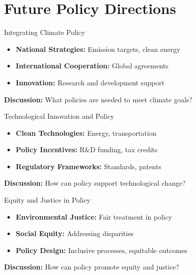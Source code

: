 \documentclass[11pt, aspectratio=169]{beamer}
\begin{document}
\section{Future Policy Directions}

\begin{frame}{Integrating Climate Policy}
    \begin{itemize}
        \item \textbf{National Strategies:} Emission targets, clean energy
        \item \textbf{International Cooperation:} Global agreements
        \item \textbf{Innovation:} Research and development support
    \end{itemize}
    \pause
    \textbf{Discussion:} What policies are needed to meet climate goals?
\end{frame}

\begin{frame}{Technological Innovation and Policy}
    \begin{itemize}
        \item \textbf{Clean Technologies:} Energy, transportation
        \item \textbf{Policy Incentives:} R\&D funding, tax credits
        \item \textbf{Regulatory Frameworks:} Standards, patents
    \end{itemize}
    \pause
    \textbf{Discussion:} How can policy support technological change?
\end{frame}

\begin{frame}{Equity and Justice in Policy}
    \begin{itemize}
        \item \textbf{Environmental Justice:} Fair treatment in policy
        \item \textbf{Social Equity:} Addressing disparities
        \item \textbf{Policy Design:} Inclusive processes, equitable outcomes
    \end{itemize}
    \pause
    \textbf{Discussion:} How can policy promote equity and justice?
\end{frame}
\end{document}
